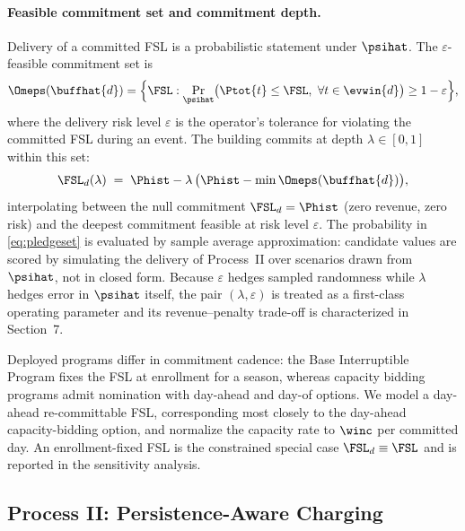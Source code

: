 \paragraph{Feasible commitment set and commitment depth.} Delivery of a
committed FSL is a probabilistic statement under $\psihat$. The
$\varepsilon$-feasible commitment set is
\begin{equation}\label{eq:pledgeset}
\Omeps(\buffhat{d}) = \Bigl\{ \FSL :
\Pr_{\psihat}\bigl(\Ptot{t} \le \FSL,\ \forall t \in \evwin{d}\bigr)
\ge 1 - \varepsilon \Bigr\},
\end{equation}
where the delivery risk level $\varepsilon$ is the operator's tolerance
for violating the committed FSL during an event. The building commits at
depth $\lambda \in [0,1]$ within this set:
\begin{equation}\label{eq:pledgedepth}
\FSL_d(\lambda) \;=\; \Phist - \lambda\,\bigl(\Phist -
\min \Omeps(\buffhat{d})\bigr),
\end{equation}
interpolating between the null commitment $\FSL_d = \Phist$ (zero revenue,
zero risk) and the deepest commitment feasible at risk level
$\varepsilon$. The probability in \eqref{eq:pledgeset} is evaluated by
sample average approximation: candidate values are scored by simulating
the delivery
of Process~II over scenarios drawn from $\psihat$, not in closed form.
Because $\varepsilon$ hedges sampled randomness while $\lambda$ hedges
error in $\psihat$ itself, the pair $(\lambda, \varepsilon)$ is treated
as a first-class operating parameter and its revenue--penalty trade-off
is characterized in Section~7.

\begin{remark}\label{rem:program}
Deployed programs differ in commitment cadence: the Base Interruptible
Program fixes the FSL at enrollment for a season, whereas capacity
bidding programs admit nomination with day-ahead and day-of options. We
model a day-ahead re-committable FSL, corresponding most closely to the
day-ahead capacity-bidding option, and normalize the capacity rate to
$\winc$ per committed day. An enrollment-fixed FSL is the constrained
special case $\FSL_d \equiv \FSL$ and is reported in the sensitivity
analysis.
\end{remark}

\subsection{Process II: Persistence-Aware Charging}\label{sec:charging}

